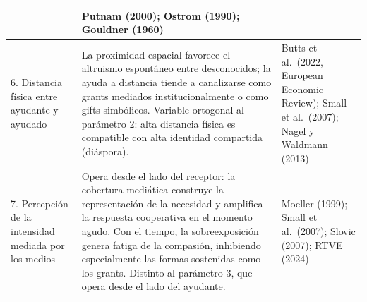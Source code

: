 \documentclass[a4paper,11pt]{article}
\begin{document}
\begin{table}
\begin{tabular}{p{5cm} p{7.5cm} p{3.5cm}}
        & Putnam (2000); Ostrom (1990); Gouldner (1960) \\
        \midrule
        6. Distancia física entre ayudante y ayudado
        & La proximidad espacial favorece el altruismo espontáneo entre desconocidos; la ayuda a distancia tiende a canalizarse como grants mediados institucionalmente o como gifts simbólicos. Variable ortogonal al parámetro 2: alta distancia física es compatible con alta identidad compartida (diáspora).
        & Butts et al.\ (2022, European Economic Review); Small et al.\ (2007); Nagel y Waldmann (2013) \\
        \midrule
        7. Percepción de la intensidad mediada por los medios
        & Opera desde el lado del receptor: la cobertura mediática construye la representación de la necesidad y amplifica la respuesta cooperativa en el momento agudo. Con el tiempo, la sobreexposición genera fatiga de la compasión, inhibiendo especialmente las formas sostenidas como los grants. Distinto al parámetro 3, que opera desde el lado del ayudante.
        & Moeller (1999); Small et al.\ (2007); Slovic (2007); RTVE (2024) \\
        \bottomrule
    \end{tabular}
\end{table}

 


\newpage
\printbibliography[title={Referencias}]
\end{document}
